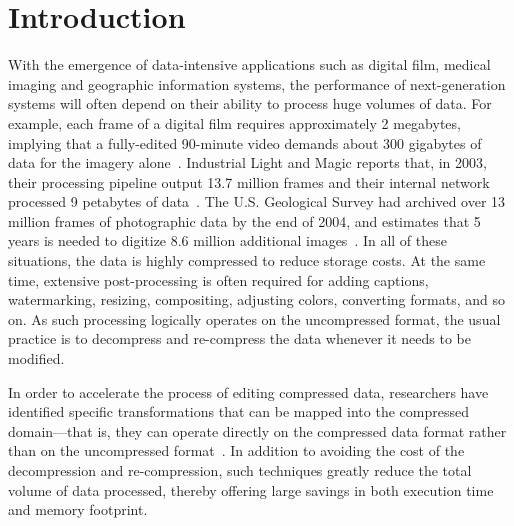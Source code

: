 \section{Introduction}

With the emergence of data-intensive applications such as digital
film, medical imaging and geographic information systems, the
performance of next-generation systems will often depend on their
ability to process huge volumes of data.  For example, each frame of a
digital film requires approximately 2 megabytes, implying that a
fully-edited 90-minute video demands about 300 gigabytes of data for
the imagery alone~\cite{ibm-video}.  Industrial Light and Magic
reports that, in 2003, their processing pipeline output 13.7 million
frames and their internal network processed 9 petabytes of
data~\cite{ilm-interview}.  The U.S. Geological Survey had archived
over 13 million frames of photographic data by the end of 2004, and
estimates that 5 years is needed to digitize 8.6 million additional
images~\cite{usgs}.  In all of these situations, the data is highly
compressed to reduce storage costs.  At the same time, extensive
post-processing is often required for adding captions, watermarking,
resizing, compositing, adjusting colors, converting formats, and so
on.  As such processing logically operates on the uncompressed format,
the usual practice is to decompress and re-compress the data whenever
it needs to be modified.


In order to accelerate the process of editing compressed data,
researchers have identified specific transformations that can be
mapped into the compressed domain---that is, they can operate directly
on the compressed data format rather than on the uncompressed
format~\cite{chang95survey,mandal95survey,smith95survey,wee02survey}.
In addition to avoiding the cost of the decompression and
re-compression, such techniques greatly reduce the total volume of
data processed, thereby offering large savings in both execution time
and memory footprint.

